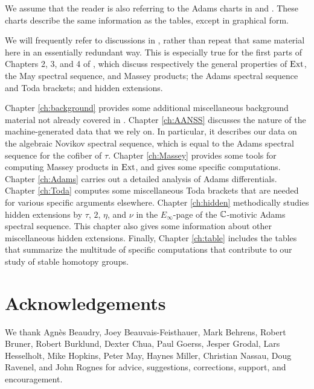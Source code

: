 We assume that the reader is also referring to the Adams charts in
\cite{Isaksen14a} and \cite{Isaksen18}.  These charts describe the
same information as the tables, except in graphical form.

  We will
frequently refer to discussions in \cite{Isaksen14c}, rather than
repeat that same material here in an essentially redundant way.
This is especially true for the first parts of Chapters 2, 3, and 4
of \cite{Isaksen14c}, which discuss respectively the general properties of
$\operatorname{Ext}$, the May spectral sequence, and Massey products; 
the Adams spectral sequence and Toda brackets;
and hidden extensions.

Chapter \ref{ch:background} provides some additional miscellaneous
background material not already covered in \cite{Isaksen14c}.
Chapter \ref{ch:AANSS} discusses the nature of
the machine-generated data that we rely on.  In particular, it
describes our data on the algebraic Novikov spectral sequence,
which is equal to the Adams spectral sequence for the cofiber of $\tau$.
Chapter \ref{ch:Massey} provides some tools for computing
Massey products in $\operatorname{Ext}$, and gives some specific computations.
Chapter \ref{ch:Adams} carries out a detailed analysis of Adams
differentials.
Chapter \ref{ch:Toda} computes some miscellaneous Toda brackets
that are needed for various specific arguments elsewhere.
Chapter \ref{ch:hidden} methodically studies hidden extensions
by $\tau$, $2$, $\eta$, and $\nu$ in the $E_\infty$-page of the
$\mathbb{C}$-motivic Adams spectral sequence.  This chapter also gives some
information about other miscellaneous hidden extensions.
Finally, Chapter \ref{ch:table} includes the tables that summarize
the multitude of specific computations that contribute to our study
of stable homotopy groups.

\section{Acknowledgements}

We thank Agn\`es Beaudry, Joey Beauvais-Feisthauer, Mark Behrens, Robert Bruner, Robert Burklund, Dexter Chua, Paul Goerss, Jesper Grodal, Lars Hesselholt, Mike Hopkins, Peter May, Haynes Miller, Christian Nassau, Doug Ravenel, and John Rognes for advice, suggestions, corrections, support, and encouragement.







